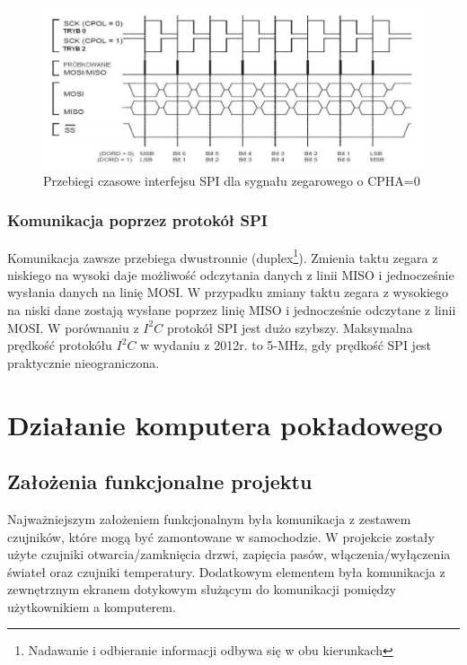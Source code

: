 \documentclass{xmgr}
\begin{document}
\begin{figure}[!h]
    \centering
    \includegraphics[height=0.25\textheight]{images/spi.png}
    \caption{Przebiegi czasowe interfejsu SPI dla sygnału zegarowego o CPHA=0}
\end{figure}

\subsection{Komunikacja poprzez protokół SPI}
Komunikacja zawsze przebiega dwustronnie (duplex\footnote{Nadawanie i odbieranie informacji odbywa się w obu kierunkach}). Zmienia taktu zegara z niskiego na wysoki daje możliwość odczytania danych z linii MISO i jednocześnie wysłania danych na linię MOSI. W przypadku zmiany taktu zegara z wysokiego na niski dane zostają wysłane poprzez linię MISO i jednocześnie odczytane z linii MOSI. W porównaniu z $I^2C$ protokół SPI jest dużo szybszy. Maksymalna prędkość protokółu $I^2C$ w wydaniu z 2012r. to 5-MHz, gdy prędkość SPI jest praktycznie nieograniczona.

\chapter{Działanie komputera pokładowego}
\section{Założenia funkcjonalne projektu}
Najważniejszym założeniem funkcjonalnym była komunikacja z zestawem czujników, które mogą być zamontowane w samochodzie. W projekcie zostały użyte czujniki otwarcia/zamknięcia drzwi, zapięcia pasów, włączenia/wyłączenia świateł oraz czujniki temperatury. Dodatkowym elementem była komunikacja z zewnętrznym ekranem dotykowym służącym do komunikacji pomiędzy użytkownikiem a komputerem.
\end{document}
